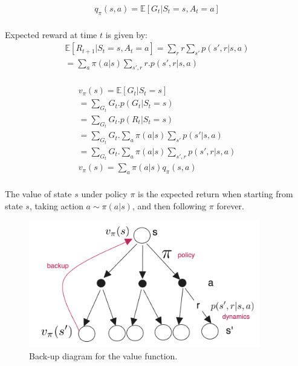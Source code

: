 \begin{equation}
    \begin{split}
        q_\pi(s, a) = \mathbb{E}[G_t | S_t = s, A_t = a] \\
        \label{eq:mdp-action-value-function}
    \end{split}
 \end{equation}

 Expected reward at time $t$ is given by:
 \begin{equation}
    \begin{split}
        \mathbb{E}[R_{t+1} | S_t = s, A_t = a] = \sum_{r} r \sum_{s'} p(s',r|s, a) \\
        = \sum_{a} \pi(a|s) \sum_{s',r} r . p(s',r|s, a) \\
        \label{eq:mdp-expected-reward}
    \end{split}
 \end{equation}

 \begin{equation}
    \begin{split}
        v_\pi(s) = \mathbb{E}[G_t | S_t = s]  \\
         = \sum_{G_t} G_t . p(G_t | S_t = s) \\
         = \sum_{G_t} G_t . p(R_t | S_t = s) \\
         = \sum_{G_t} G_t . \sum_{a} \pi(a|s) \sum_{s'} p(s'|s, a) \\
         = \sum_{G_t} G_t . \sum_{a} \pi(a|s) \sum_{s',r} p(s',r|s, a) \\
         v_\pi(s)  = \sum_{a} \pi(a|s) q_\pi(s, a) \\
        \label{eq:mdp-bellman-equation}
    \end{split}
 \end{equation}

 The value of state $s$ under policy $\pi$ is the expected return when starting from state $s$, 
 taking action $a \sim \pi(a|s)$, and then following $\pi$ forever.

 \begin{figure}[h]
    \centering
    \includegraphics[width=0.9\textwidth]{img/backup_diagram2.png}
    \caption{Back-up diagram for the value function.}
    \label{fig:mdp-back-up-diagram}
 \end{figure}



